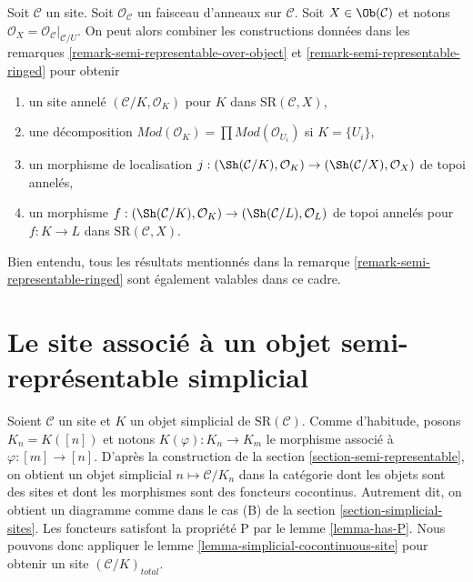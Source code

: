 \begin{remark}
\label{remark-semi-representable-ringed-over-object}
Soit $\mathcal{C}$ un site. Soit $\mathcal{O}_\mathcal{C}$
un faisceau d'anneaux sur $\mathcal{C}$. Soit $X \in \Ob(\mathcal{C})$
et notons $\mathcal{O}_X = \mathcal{O}_\mathcal{C}|_{\mathcal{C}/U}$.
On peut alors combiner les constructions données dans les
remarques \ref{remark-semi-representable-over-object}
et \ref{remark-semi-representable-ringed} pour obtenir
\begin{enumerate}
\item un site annelé $(\mathcal{C}/K, \mathcal{O}_K)$
pour $K$ dans $\text{SR}(\mathcal{C}, X)$,
\item une décomposition
$\textit{Mod}(\mathcal{O}_K) =
\prod \textit{Mod}(\mathcal{O}_{U_i})$ si $K = \{U_i\}$,
\item un morphisme de localisation
$j : (\Sh(\mathcal{C}/K), \mathcal{O}_K) \to
(\Sh(\mathcal{C}/X), \mathcal{O}_X)$
de topoi annelés,
\item un morphisme
$f : (\Sh(\mathcal{C}/K), \mathcal{O}_K) \to
(\Sh(\mathcal{C}/L), \mathcal{O}_L)$ de topoi annelés
pour $f : K \to L$ dans $\text{SR}(\mathcal{C}, X)$.
\end{enumerate}
Bien entendu, tous les résultats mentionnés dans
la remarque \ref{remark-semi-representable-ringed}
sont également valables dans ce cadre.
\end{remark}





\section{Le site associé à un objet semi-représentable simplicial}
\label{section-simplicial-semi-representable}

\noindent
Soient $\mathcal{C}$ un site et $K$ un objet simplicial de
$\text{SR}(\mathcal{C})$. Comme d'habitude, posons $K_n = K([n])$ et notons
$K(\varphi) : K_n \to K_m$ le morphisme associé à $\varphi : [m] \to [n]$.
D'après la construction de la
section \ref{section-semi-representable}, on obtient un objet simplicial
$n \mapsto \mathcal{C}/K_n$ dans la catégorie dont les objets sont des sites et
dont les morphismes sont des foncteurs cocontinus. Autrement dit, on obtient
un diagramme comme dans le cas (B) de la section \ref{section-simplicial-sites}.
Les foncteurs satisfont la propriété P par le lemme \ref{lemma-has-P}.
Nous pouvons donc appliquer le lemme
\ref{lemma-simplicial-cocontinuous-site}
pour obtenir un site $(\mathcal{C}/K)_{total}$.

